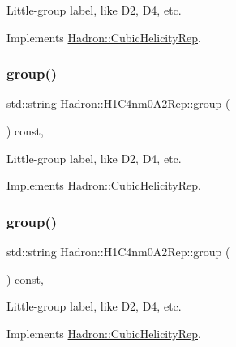 Little-\/group label, like D2, D4, etc. 

Implements \mbox{\hyperlink{structHadron_1_1CubicHelicityRep_a101a7d76cd8ccdad0f272db44b766113}{Hadron\+::\+Cubic\+Helicity\+Rep}}.

\mbox{\label{structHadron_1_1H1C4nm0A2Rep_a3033103082fad0b1572469c929fde9bb}} 
\subsubsection{\texorpdfstring{group()}{group()}\hspace{0.1cm}{\footnotesize\ttfamily [2/3]}}
{\footnotesize\ttfamily std\+::string Hadron\+::\+H1\+C4nm0\+A2\+Rep\+::group (\begin{DoxyParamCaption}{ }\end{DoxyParamCaption}) const\hspace{0.3cm}{\ttfamily [inline]}, {\ttfamily [virtual]}}

Little-\/group label, like D2, D4, etc. 

Implements \mbox{\hyperlink{structHadron_1_1CubicHelicityRep_a101a7d76cd8ccdad0f272db44b766113}{Hadron\+::\+Cubic\+Helicity\+Rep}}.

\mbox{\label{structHadron_1_1H1C4nm0A2Rep_a3033103082fad0b1572469c929fde9bb}} 
\subsubsection{\texorpdfstring{group()}{group()}\hspace{0.1cm}{\footnotesize\ttfamily [3/3]}}
{\footnotesize\ttfamily std\+::string Hadron\+::\+H1\+C4nm0\+A2\+Rep\+::group (\begin{DoxyParamCaption}{ }\end{DoxyParamCaption}) const\hspace{0.3cm}{\ttfamily [inline]}, {\ttfamily [virtual]}}

Little-\/group label, like D2, D4, etc. 

Implements \mbox{\hyperlink{structHadron_1_1CubicHelicityRep_a101a7d76cd8ccdad0f272db44b766113}{Hadron\+::\+Cubic\+Helicity\+Rep}}.

